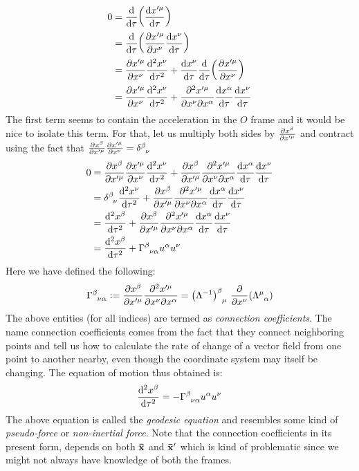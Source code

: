 \begin{align*}
    0 &=\dv{\tau}\qty(\dv{x'^\mu}{\tau})\\
    &=\dv{\tau}\qty({\pdv{x'^\mu}{x^\nu}\dv{x^\nu}{\tau}} )\\
    &=\pdv{x'^\mu}{x^\nu} \dv[2]{x^\nu}{\tau}+ \dv{x^\nu}{\tau}\dv{\tau}\qty(\pdv{x'^\mu}{x^\nu})\\
    &=\pdv{x'^\mu}{x^\nu} \dv[2]{x^\nu}{\tau} + \pdv{x'^\mu}{x^\nu}{x^\alpha}\dv{x^\alpha}{\tau}\dv{x^\nu}{\tau}
\end{align*}
The first term seems to contain the acceleration in the $O$ frame and it would be nice to isolate this term. For that, let us multiply both sides by $\pdv{x^\beta}{x'^\mu}$ and contract using the fact that $\pdv{x^\beta}{x'^\mu}\pdv{x'^\mu}{x^\nu}=\tsrud{\delta}{\beta}{\nu}$
\begin{align*}
   0&= \pdv{x^\beta}{x'^\mu}\pdv{x'^\mu}{x^\nu} \dv[2]{x^\nu}{\tau} +  \pdv{x^\beta}{x'^\mu}\pdv{x'^\mu}{x^\nu}{x^\alpha}\dv{x^\alpha}{\tau}\dv{x^\nu}{\tau}\\
&=\tsrud{\delta}{\beta}{\nu}\dv[2]{x^\nu}{\tau}+ \pdv{x^\beta}{x'^\mu}\pdv{x'^\mu}{x^\nu}{x^\alpha}\dv{x^\alpha}{\tau}\dv{x^\nu}{\tau}\\
&=\dv[2]{x^\beta}{\tau}+ \pdv{x^\beta}{x'^\mu}\pdv{x'^\mu}{x^\nu}{x^\alpha}\dv{x^\alpha}{\tau}\dv{x^\nu}{\tau}\\
&=\dv[2]{x^\beta}{\tau} + \chris{\beta}{\nu}{\alpha} u^\alpha u^\nu
\end{align*}
Here we have defined the following:
$$\chris{\beta}{\nu}{\alpha} := \pdv{x^\beta}{x'^\mu}\pdv{x'^\mu}{x^\nu}{x^\alpha} = \itrmat{\beta}{\mu}\ \pdv{x^\nu} \qty(\trmat{\mu}{\alpha})$$
The above entities (for all indices) are termed as \textit{connection coefficients}. The name connection coefficients comes from the fact that they connect neighboring points and tell us how to calculate the rate of change of a vector field from one point to another nearby, even though the coordinate system may itself be changing. The equation of motion thus obtained is:
\begin{equation}\label{eqn:geod}
    \dv[2]{x^\beta}{\tau} = -\chris{\beta}{\nu}{\alpha} u^\alpha u^\nu
\end{equation}
The above equation is called the \textit{geodesic equation} and resembles some kind of \textit{pseudo-force} or \textit{non-inertial force}. Note that the connection coefficients in its present form, depends on both $\vb{\bar{x}}$ and $\vb{\bar{x}}'$ which is kind of problematic since we might not always have knowledge of both the frames. \\[0.2cm]
